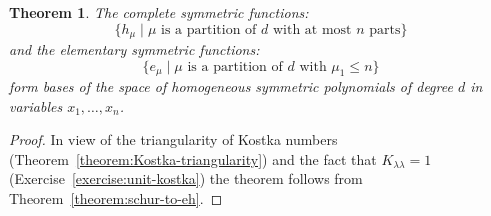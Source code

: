 \documentclass[11pt]{amsart}
\newtheorem{theorem}{Theorem}[subsection]
\theoremstyle{definition}
\theoremstyle{example}
\begin{document}
\begin{theorem}
  The complete symmetric functions:
  \begin{displaymath}
    \{h_\mu \mid \text{$\mu$ is a partition of $d$ with at most $n$ parts}\}
  \end{displaymath}
  and the elementary symmetric functions:
  \begin{displaymath}
    \{e_\mu\mid \text{$\mu$ is a partition of $d$ with $\mu_1\leq n$}\}
  \end{displaymath}
  form bases of the space of homogeneous symmetric polynomials of degree $d$ in variables $x_1,\dotsc,x_n$.
\end{theorem}
\begin{proof}
  In view of the triangularity of Kostka numbers (Theorem~\ref{theorem:Kostka-triangularity}) and the fact that $K_{\lambda\lambda}=1$ (Exercise~\ref{exercise:unit-kostka}) the theorem follows from Theorem~\ref{theorem:schur-to-eh}.
\end{proof}
\end{document}

